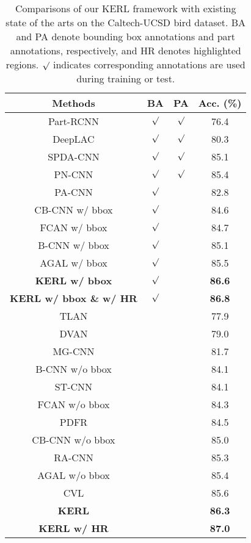 \documentclass{article}
\begin{document}
\begin{table}[!t]
\centering
\footnotesize
\begin{tabular}{c|c|c|c}
\hline
\centering  Methods  & BA & PA  & Acc. (\%)  \\
\hline
\hline
Part-RCNN \cite{zhang2014part} & $\surd$ & $\surd$ & 76.4 \\
DeepLAC \cite{lin2015deep} & $\surd$ & $\surd$ & 80.3 \\
SPDA-CNN \cite{zhang2016spda} & $\surd$ & $\surd$ & 85.1 \\
PN-CNN \cite{branson2014bird} & $\surd$ & $\surd$ & 85.4 \\
PA-CNN \cite{krause2015fine} & $\surd$ & & 82.8 \\
CB-CNN w/ bbox \cite{gao2016compact} & $\surd$ && 84.6 \\
FCAN w/ bbox \cite{liu2016fully} & $\surd$ &  & 84.7 \\
B-CNN w/ bbox \cite{lin2015bilinear} & $\surd$ & & 85.1 \\
AGAL w/ bbox \cite{liu2017localizing} & $\surd$ & & 85.5 \\
\hline
\textbf{KERL w/ bbox} &$\surd$ & & \textbf{86.6} \\
\textbf{KERL w/ bbox \& w/ HR} &$\surd$ & & \textbf{86.8} \\
\hline
\hline
TLAN \cite{xiao2015application} & & & 77.9 \\
DVAN \cite{zhao2017diversified} & & & 79.0 \\
MG-CNN \cite{wang2015multiple} & & &81.7 \\
B-CNN w/o bbox \cite{lin2015bilinear} & & & 84.1 \\
ST-CNN \cite{jaderberg2015spatial} & & & 84.1 \\
FCAN w/o bbox \cite{liu2016fully} & &  & 84.3 \\
PDFR \cite{zhang2016picking} & & & 84.5 \\
CB-CNN w/o bbox \cite{gao2016compact} &&& 85.0 \\
RA-CNN \cite{fu2017look} & &  & 85.3 \\
AGAL w/o bbox \cite{liu2017localizing} & &  & 85.4 \\
CVL \cite{he2017fine} & & & 85.6 \\
\hline
\textbf{KERL} & & & \textbf{86.3} \\ 
\textbf{KERL w/ HR} & & & \textbf{87.0} \\ 
\hline
\end{tabular}
\caption{Comparisons of our KERL framework with existing state of the arts on the Caltech-UCSD bird dataset. BA and PA denote bounding box annotations and part annotations, respectively, and HR denotes highlighted regions. $\surd$ indicates corresponding annotations are used during training or test.}
\label{table:cub-resule}
\end{table}
\end{document}
